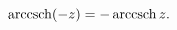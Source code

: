 \[\mathop{\mathrm{arccsch}\/}\nolimits\!\left(-z\right)=-\mathop{\mathrm{arccsch%
}\/}\nolimits z.\]